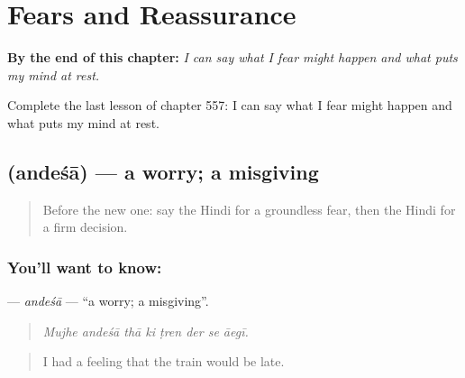 
\chapter{Fears and Reassurance}
\label{ch:hi-fears-and-reassurance}

\begin{chapteropening}
\textbf{By the end of this chapter:} \emph{I can say what I fear might happen and what puts my mind at rest.}

Complete the last lesson of chapter 557: I can say what I fear might happen and what puts my mind at rest.
\end{chapteropening}

\section[\texorpdfstring{\hi{अंदेशा} (andeśā)}{अंदेशा (andeśā)}]{ (andeśā) — a worry; a misgiving}

\label{lesson:HI-C557-andesa}



\begin{quote}
Before the new one: say the Hindi for a groundless fear, then the Hindi for a firm decision.
\end{quote}

\subsection*{You'll want to know: }
\textbf{} — \emph{andeśā} — \textquotedblleft{}a worry; a misgiving\textquotedblright{}.

\begin{quote}
       
\end{quote}

\begin{quote}
\emph{Mujhe andeśā thā ki ṭren der se āegī.}
\end{quote}

\begin{quote}
I had a feeling that the train would be late.
\end{quote}


